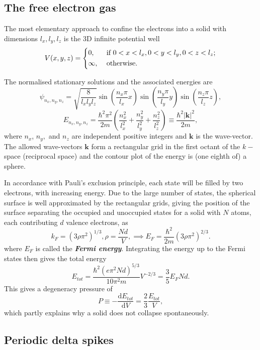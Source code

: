 \documentclass{article}
\theoremstyle{nonumberplain}
\begin{document}
\subsection{The free electron gas}
The most elementary approach to confine the electrons into a solid with dimensions $l_x, l_y, l_z$ is the 3D infinite potential well
\[
    V(x,y,z) = 
    \begin{dcases}
        0, &\text{ if } 0<x<l_x, 0<y<l_y, 0<z<l_z ;\\
        \infty , &\text{ otherwise}  .
    \end{dcases}
\]

The normalised stationary solutions and the associated energies are 
\[
    \psi_{n_x,n_{y} ,n_{z} } = \sqrt{\frac{8}{l_{x} l_{y} l_{z} }} 
    \sin \left( \frac{n_{x} \pi }{l_{x} }x \right)
    \sin \left( \frac{n_{y} \pi }{l_{y} }y \right)
    \sin \left( \frac{n_{z} \pi }{l_{z} }z \right),
\]
\[
    E_{n_{x} ,n_{y} ,n_{z} } = 
    \frac{\hbar ^{2} \pi ^{2} }{2 m } \left( \frac{n_{x} ^{2} }{l_{x} ^{2} } + \frac{n_{y} ^{2} }{l_{y} ^{2} } + \frac{n_{z} ^{2} }{l_{z} ^{2} }\right)
    \equiv \frac{\hbar ^{2} \left\vert \mathbf{k}  \right\vert ^{2} }{2m}, 
\]
where $n_x$, $n_{y} ,$ and $n_{z} $ are independent positive integers and $\mathbf{k} $ is the wave-vector. 
The allowed wave-vectors $\mathbf{k} $ form a rectangular grid in the first octant of the $k-$space (reciprocal space) and the contour plot of the energy is (one eighth of) a sphere. 

In accordance with Pauli's exclusion principle, each state will be filled by two electrons, with increasing energy. Due to the large number of states, the spherical surface is well approximated by the rectangular grids, giving the position of the surface separating the occupied and unoccupied states for a solid with $N$ atoms, each contributing $d$ valence electrons, as 
\[
    k_F = \left( 3 \rho \pi ^{2} \right)^{1 /3}, 
    \rho  = \frac{Nd}{V}, 
    \implies E_F = \frac{\hbar ^{2} }{2m } \left( 3 \rho \pi ^{2} \right)^{2 /3}.  
\]
where $E_F$ is called the \textit{\textbf{Fermi energy}}. Integrating the energy up to the Fermi states then gives the total energy 
\[
    E_{tot} = \frac{\hbar ^{2} (e \pi ^{2} N d)^{5 /3}}{10 \pi ^{2} m } V^{-2/3}
    = \frac{3}{5} E_F Nd. 
\]
This gives a degeneracy pressure of 
\[
    P \equiv - \frac{\mathrm{d}E_{tot}}{\mathrm{d}V}
    = \frac{2}{3} \frac{E_{tot}}{V}, 
\]
which partly explains why a solid does not collapse spontaneously. 
\subsection{Periodic delta spikes}  
\end{document}
